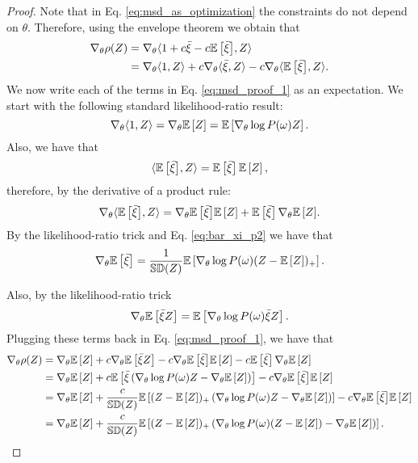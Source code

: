 \begin{proof}
Note that in Eq. \eqref{eq:msd_as_optimization} the constraints do not depend on $\theta$. Therefore, using the envelope theorem we obtain that
\begin{equation}\label{eq:msd_proof_1}
\begin{split}
  \dt{\rho(Z)} &= \dt{ \dotp{1 + c\bar{\xi} - c\Exp{\bar{\xi}}}{Z} } \\
    &= \dt{ \dotp{1}{Z} } +c \dt{ \dotp{\bar{\xi}}{Z} } - c \dt{ \dotp{\Exp{\bar{\xi}}}{Z} }.
\end{split}
\end{equation}
We now write each of the terms in Eq. \eqref{eq:msd_proof_1} as an expectation.
We start with the following standard likelihood-ratio result:
\begin{equation*}
    \dt{\dotp{1}{Z}} = \dt{\Exp{Z}} = \Exp{\dt \log P(\omega) Z}.
\end{equation*}
Also, we have that
\begin{equation*}
    \dotp{\Exp{\bar{\xi}}}{Z} = \Exp{\bar{\xi}}\Exp{Z},
\end{equation*}
therefore, by the derivative of a product rule:
\begin{equation*}
    \dt{\dotp{\Exp{\bar{\xi}}}{Z}} = \dt{\Exp{\bar{\xi}}}\Exp{Z} + \Exp{\bar{\xi}}\dt{\Exp{Z}}.
\end{equation*}
By the likelihood-ratio trick and Eq. \eqref{eq:bar_xi_p2} we have that
\begin{equation*}
    \dt{\Exp{\bar{\xi}}} = \frac{1}{\SD(Z)} \Exp{\dt \log P(\omega) (Z - \Exp{Z})_{+} }.
\end{equation*}


Also, by the likelihood-ratio trick
\begin{equation*}
\dt{\Exp{\bar{\xi} Z}} = \Exp{\dt \log P(\omega) \bar{\xi} Z}.
\end{equation*}
Plugging these terms back in Eq. \eqref{eq:msd_proof_1}, we have that
\begin{equation*}
\begin{split}
  \dt{\rho(Z)} &= \dt{\Exp{Z}} + c\dt{\Exp{\bar{\xi} Z}} - c\dt{\Exp{\bar{\xi}}}\Exp{Z} -c\Exp{\bar{\xi}}\dt{\Exp{Z}} \\
    &= \dt{\Exp{Z}} + c\Exp{\bar{\xi} \left(\dt \log P(\omega) Z - \dt{\Exp{Z}}\right)} - c\dt{\Exp{\bar{\xi}}}\Exp{Z} \\
    &= \dt{\Exp{Z}} + \frac{c}{\SD(Z)}\Exp{(Z - \Exp{Z})_{+} \left(\dt \log P(\omega) Z - \dt{\Exp{Z}}\right)} - c\dt{\Exp{\bar{\xi}}}\Exp{Z} \\
    &= \dt{\Exp{Z}} + \frac{c}{\SD(Z)}\Exp{(Z - \Exp{Z})_{+} \left(\dt \log P(\omega) (Z - \Exp{Z}) - \dt{\Exp{Z}}\right)}.\\
\end{split}
\end{equation*}
\end{proof}

